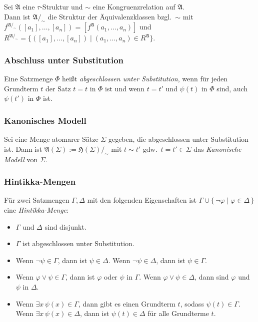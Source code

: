 \documentclass[a4paper,parskip=half*,DIV=15,fontsize=11pt]{scrartcl}
\newcommand{\A}{\mathfrak{A}}
\newcommand{\He}{\mathfrak{H}}
\begin{document}
Sei $\A$ eine $\tau$-Struktur und $\sim$ eine Kongruenzrelation auf $\A$.   \\
Dann ist $\A /_{\sim}$ die Struktur der Äquivalenzklassen bzgl.\ $\sim$ mit $f^{\A /_{\sim}}([a_1],\ldots, [a_n]) = [f^\A(a_1,\ldots,a_n)]$ und $R^{\A/_{\sim}} = \{([a_1],\ldots,[a_n]) \;|\; (a_1,\ldots,a_n) \in R^\A\}$.

\subsubsection{Abschluss unter Substitution}

Eine Satzmenge $\Phi$ heißt \emph{abgeschlossen unter Substitution}, wenn für jeden Grundterm $t$ der Satz $t = t$ in $\Phi$ ist und wenn $t = t'$ und $\psi(t)$ in $\Phi$ sind, auch $\psi(t')$ in $\Phi$ ist.

\subsubsection{Kanonisches Modell}

Sei eine Menge atomarer Sätze $\Sigma$ gegeben, die abgeschlossen unter Substitution ist. Dann ist $\A(\Sigma) := \He(\Sigma)/_{\sim}$ mit $t \sim t'$ gdw.\ $t = t' \in \Sigma$ das \emph{Kanonische Modell} von $\Sigma$.

\subsubsection{Hintikka-Mengen}

Für zwei Satzmengen $\Gamma, \Delta$ mit den folgenden Eigenschaften ist $\Gamma \cup \{\,\neg \varphi \;|\; \varphi \in \Delta\,\}$ eine \emph{Hintikka-Menge}:
\begin{itemize}
\item $\Gamma$ und $\Delta$ sind disjunkt.
\item $\Gamma$ ist abgeschlossen unter Substitution.
\item Wenn $\neg \psi \in \Gamma$, dann ist $\psi \in \Delta$. Wenn $\neg \psi \in \Delta$, dann ist $\psi \in \Gamma$.
\item Wenn $\varphi \lor \psi \in \Gamma$, dann ist $\varphi$ oder $\psi$ in $\Gamma$. Wenn $\varphi \lor \psi \in \Delta$, dann sind $\varphi$ und $\psi$ in $\Delta$.
\item Wenn $\exists x\, \psi(x) \in \Gamma$, dann gibt es einen Grundterm $t$, sodass $\psi(t) \in \Gamma$. Wenn $\exists x\, \psi(x) \in \Delta$, dann ist $\psi(t) \in \Delta$ für alle Grundterme $t$.
\end{itemize}
\end{document}

